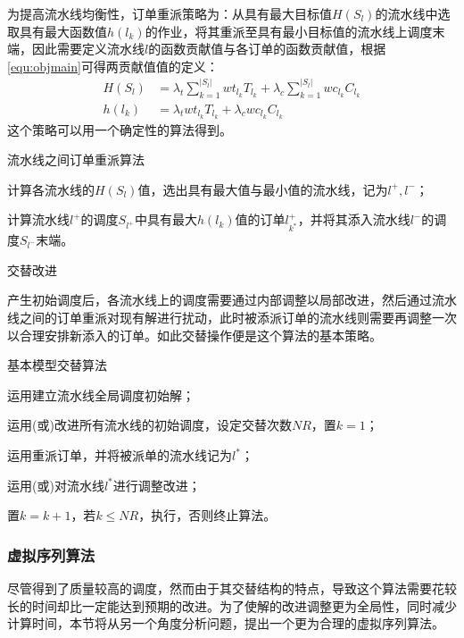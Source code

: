 \begin{asparaenum}
为提高流水线均衡性，订单重派策略为：从具有最大目标值$H(S_l)$的流水线中选取具有最大函数值$h(l_k)$的作业，将其重派至具有最小目标值的流水线上调度末端，因此需要定义流水线$l$的函数贡献值与各订单的函数贡献值，根据\eqref{equ:objmain}可得两贡献值值的定义：
\begin{align}
H(S_l) &= \lambda_t\sum_{k=1}^{|S_l|} wt_{l_k}T_{l_k} + \lambda_c\sum_{k=1}^{|S_l|}wc_{l_k}C_{l_k}\label{equ:linefunct}\\
h(l_k) &= \lambda_t wt_{l_k}T_{l_k} + \lambda_c wc_{l_k}C_{l_k}
\label{equ:itemfunct}
\end{align}
这个策略可以用一个确定性的算法得到。
\begin{algori}
流水线之间订单重派算法\label{alg:between}
\begin{asparaenum}
\renewcommand{\labelenumi}{\bf Step\theenumi~}
\item 计算各流水线的$H(S_l)$值，选出具有最大值与最小值的流水线，记为$l^+, l^-$；
\item 计算流水线$l^+$的调度$S_{l^+}$中具有最大$h(l_k)$值的订单$l^+_{k^*}$，并将其添入流水线$l^-$的调度$S_{l^-}$末端。
\end{asparaenum}
\end{algori}

\item 交替改进
\end{asparaenum} 

产生初始调度后，各流水线上的调度需要通过内部调整以局部改进，然后通过流水线之间的订单重派对现有解进行扰动，此时被添派订单的流水线则需要再调整一次以合理安排新添入的订单。如此交替操作便是这个算法的基本策略。
\begin{algori}
基本模型交替算法\label{alg:inturnbasic}
\begin{asparaenum}
\renewcommand{\labelenumi}{\bf Step\theenumi~}
\item 运用建立流水线全局调度初始解；
\item 运用(或)改进所有流水线的初始调度，设定交替次数$NR$，置$k = 1$；
\item 运用重派订单，并将被派单的流水线记为$l^*$；
\item 运用(或)对流水线$l^*$进行调整改进；
\item 置$k = k+1$，若$k\le NR$，执行，否则终止算法。
\end{asparaenum}
\end{algori}

\subsubsection{虚拟序列算法}
尽管得到了质量较高的调度，然而由于其交替结构的特点，导致这个算法需要花较长的时间却比一定能达到预期的改进。为了使解的改进调整更为全局性，同时减少计算时间，本节将从另一个角度分析问题，提出一个更为合理的虚拟序列算法。

